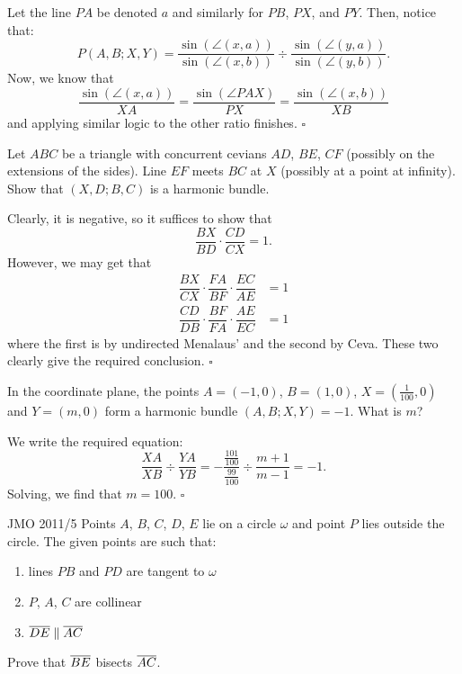 \documentclass{article}
\begin{document}
Let the line $PA$ be denoted $a$ and similarly for $PB$, $PX$, and $PY$. Then, notice that: \[P(A, B; X, Y ) = \dfrac{\sin(\angle(x, a))}{\sin(\angle(x, b))}\div \dfrac{\sin(\angle(y, a))}{\sin(\angle(y, b))}.\] Now, we know that \[\dfrac{\sin(\angle(x, a))}{XA} = \dfrac{\sin(\angle PAX)}{PX} = \dfrac{\sin(\angle(x, b))}{XB}\] and applying similar logic to the other ratio finishes. $\square$

\begin{problem}[9.14]{}
Let $ABC$ be a triangle with concurrent cevians $AD$, $BE$, $CF$ (possibly on the extensions of the sides). Line $EF$ meets $BC$ at $X$ (possibly at a point at infinity). Show that $(X, D;B,C)$ is a harmonic bundle.
\end{problem}

Clearly, it is negative, so it suffices to show that \[\dfrac{BX}{BD}\cdot \dfrac{CD}{CX} = 1.\] However, we may get that
\begin{align*}
\dfrac{BX}{CX}\cdot\dfrac{FA}{BF}\cdot\dfrac{EC}{AE} &= 1 \\
\dfrac{CD}{DB}\cdot\dfrac{BF}{FA}\cdot\dfrac{AE}{EC} &= 1
\end{align*}
where the first is by undirected Menalaus' and the second by Ceva. These two clearly give the required conclusion. $\square$

\begin{problem}[9.15]{}
In the coordinate plane, the points $A = (-1, 0)$, $B = (1, 0)$, $X = \left(\tfrac{1}{100}, 0\right)$ and $Y = (m, 0)$ form a harmonic bundle $(A, B; X, Y ) = -1$. What is $m$?
\end{problem}

We write the required equation: \[\dfrac{XA}{XB}\div\dfrac{YA}{YB} = -\dfrac{\tfrac{101}{100}}{\tfrac{99}{100}}\div\dfrac{m+1}{m-1} = -1.\] Solving, we find that $m = 100$. $\square$

\begin{problem}[9.16]{JMO 2011/5}
Points $A$, $B$, $C$, $D$, $E$ lie on a circle $\omega$ and point $P$ lies outside the circle. The given points are such that:
\begin{enumerate}[label={(\roman*)}]
    \item  lines $PB$ and $PD$ are tangent to $\omega$
    \item  $P$, $A$, $C$ are collinear
    \item  $\overline{DE} \parallel \overline{AC}$
\end{enumerate}
Prove that $\overline{BE}$ bisects $\overline{AC}$. 
\end{problem}
\end{document}
